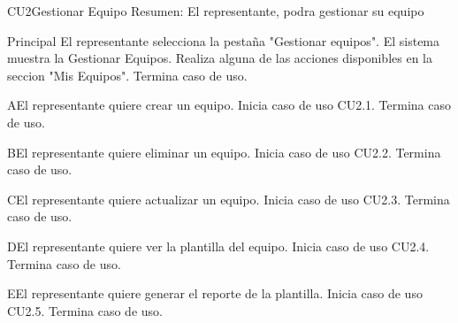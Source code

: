 

	\begin{UseCase}{CU2}{Gestionar Equipo}{
		Resumen: El representante, podra gestionar su equipo}
	\end{UseCase}
	\newpage
	
	\begin{UCtrayectoria}{Principal}
		\UCpaso[\UCactor] El representante selecciona la pestaña "Gestionar equipos". 
		\UCpaso El sistema muestra la  {Gestionar Equipos}.
		\UCpaso [\UCactor] Realiza alguna de las acciones disponibles en la seccion "Mis Equipos".       
		\UCpaso Termina caso de uso.
	\end{UCtrayectoria}

	\begin{UCtrayectoriaA}{A}{El representante quiere crear un equipo.}
		\UCpaso Inicia caso de uso CU2.1.
  		\UCpaso Termina caso de uso.
	\end{UCtrayectoriaA}

	\begin{UCtrayectoriaA}{B}{El representante quiere eliminar un equipo.}
		\UCpaso Inicia caso de uso CU2.2.
  		\UCpaso Termina caso de uso.
	\end{UCtrayectoriaA}
	
	\begin{UCtrayectoriaA}{C}{El representante quiere actualizar un equipo.}
		\UCpaso Inicia caso de uso CU2.3.
  		\UCpaso Termina caso de uso.
	\end{UCtrayectoriaA}
	
	\begin{UCtrayectoriaA}{D}{El representante quiere ver la plantilla del equipo.}
		\UCpaso Inicia caso de uso CU2.4.
  		\UCpaso Termina caso de uso.
	\end{UCtrayectoriaA}
	
	\begin{UCtrayectoriaA}{E}{El representante quiere generar el reporte de la plantilla.}
		\UCpaso Inicia caso de uso CU2.5.
  		\UCpaso Termina caso de uso.
	\end{UCtrayectoriaA}
	
	
